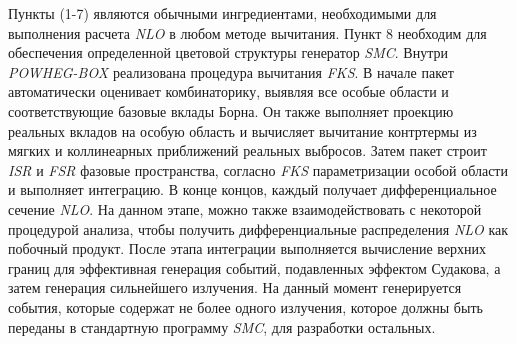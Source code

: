 Пункты (1-7) являются обычными ингредиентами, необходимыми для выполнения расчета \textit{NLO}
в любом методе вычитания. Пункт 8 необходим для обеспечения определенной цветовой структуры
генератор \textit{SMC}. Внутри \textit{POWHEG-BOX} реализована процедура вычитания \textit{FKS}. В начале пакет автоматически оценивает комбинаторику, выявляя
все особые области и соответствующие базовые вклады Борна. Он также выполняет
проекцию реальных вкладов на особую область и вычисляет вычитание
контртермы из мягких и коллинеарных приближений реальных выбросов. Затем пакет строит
\textit{ISR} и \textit{FSR} фазовые пространства, согласно \textit{FKS} параметризации особой области и
выполняет интеграцию. В конце концов, каждый получает дифференциальное сечение \textit{NLO}. На данном этапе,
можно также взаимодействовать с некоторой процедурой анализа, чтобы получить дифференциальные распределения \textit{NLO} как
побочный продукт. После этапа интеграции выполняется вычисление верхних границ для
эффективная генерация событий, подавленных эффектом Судакова, а затем генерация сильнейшего излучения. На данный момент генерируется события, которые содержат не более одного излучения, которое должны быть переданы в стандартную программу \textit{SMC}, для разработки остальных.

